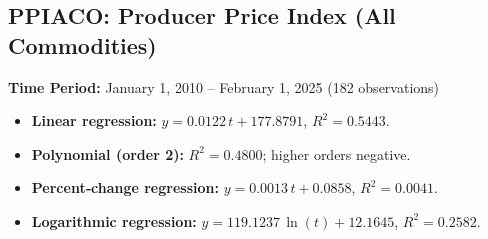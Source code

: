 \documentclass[11pt,a4paper]{article}
\begin{document}
\clearpage
\subsection{PPIACO: Producer Price Index (All Commodities)}
\textbf{Time Period:} January 1, 2010 – February 1, 2025 (182 observations)

\begin{itemize}
  \item \textbf{Linear regression:} \(y = 0.0122\,t + 177.8791\), \(R^2 = 0.5443\).
  \item \textbf{Polynomial (order 2):} \(R^2 = 0.4800\); higher orders negative.
  \item \textbf{Percent‐change regression:} \(y = 0.0013\,t + 0.0858\), \(R^2 = 0.0041\).
  \item \textbf{Logarithmic regression:} \(y = 119.1237\,\ln(t) + 12.1645\), \(R^2 = 0.2582\).
\end{itemize}
\end{document}
